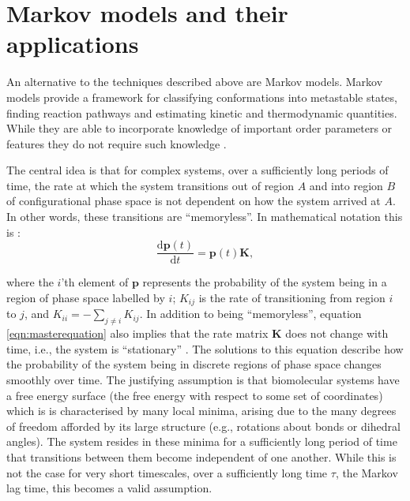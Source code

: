 \section{Markov models and their applications}\label{sec:mm_applications}
An alternative to the techniques described above are Markov models.  Markov models provide a framework for classifying conformations into metastable states, finding reaction pathways and estimating kinetic and thermodynamic quantities. While they are able to incorporate knowledge of important order parameters or features they do not require such knowledge \cite{husicMarkovStateModels2018, pandeEverythingYouWanted2010}.

The central idea \cite{zwanzigClassicalDynamicsContinuous1983a} is that for complex systems, over a sufficiently long periods of time, the rate at which the system transitions out of region $A$ and into region $B$ of configurational phase space is not dependent on how the system arrived at $A$. In other words, these transitions are ``memoryless''. In mathematical notation this is \cite{noeTransitionNetworksModeling2008}: 
\begin{equation}\label{eqn:masterequation}
    \frac{\mathrm{d}\mathbf{p}(t)}{\mathrm{d}t} = \mathbf{p}(t)\mathbf{K},
\end{equation}

where the $i$'th element of $\mathbf{p}$ represents the probability of the system being in a region of phase space labelled by $i$; $K_{ij}$ is the rate of transitioning from region $i$ to $j$, and $K_{ii} = -\sum_{j\ne i} K_{ij}$. In addition to being ``memoryless'', equation \ref{eqn:masterequation} also implies that the rate matrix $\mathbf{K}$ does not change with time, i.e., the system is ``stationary'' \cite{zwanzigClassicalDynamicsContinuous1983a}.  The solutions to this equation describe how the probability of the system being in discrete regions of phase space changes smoothly over time. The justifying assumption is that biomolecular systems have a free energy surface (the free energy with respect to some set of coordinates) which is is characterised by many local minima, arising due to the many degrees of freedom afforded by its large structure (e.g., rotations about bonds or dihedral angles). The system resides in these minima for a sufficiently long period of time that transitions between them become independent of one another.  While this is not the case for very short timescales, over a sufficiently long time $\tau$, the Markov lag time, this becomes a valid assumption. 

